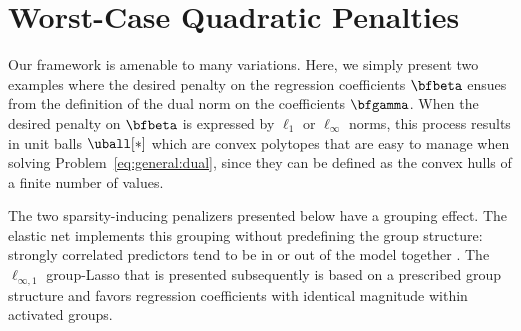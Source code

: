 \section{Worst-Case Quadratic Penalties \label{sec:quadra}}
\label{sec:gammaperturb}

Our framework is amenable to many variations.
Here, we simply present two examples where
the desired penalty on the regression coefficients $\bfbeta$ ensues from the 
definition of the dual norm on the coefficients $\bfgamma$.
When the desired penalty on $\bfbeta$ is expressed by
$\ell_1$ or $\ell_\infty$ norms, this process results in unit balls
$\uball[*]$ which are convex polytopes that are 
easy to manage when solving Problem~\eqref{eq:general:dual}, since they
can be defined as the convex hulls of a finite number of values.

The two sparsity-inducing penalizers presented below have a grouping effect.
The elastic net implements this grouping without predefining the group
structure: strongly correlated predictors tend to be in or out of the model
together \citep{2005_JRSS_Zou}.  
The $\ell_{\infty,1}$ group-Lasso that is presented subsequently is based on a
prescribed group structure and favors regression coefficients with identical
magnitude within activated groups.

 

% 



%




%
